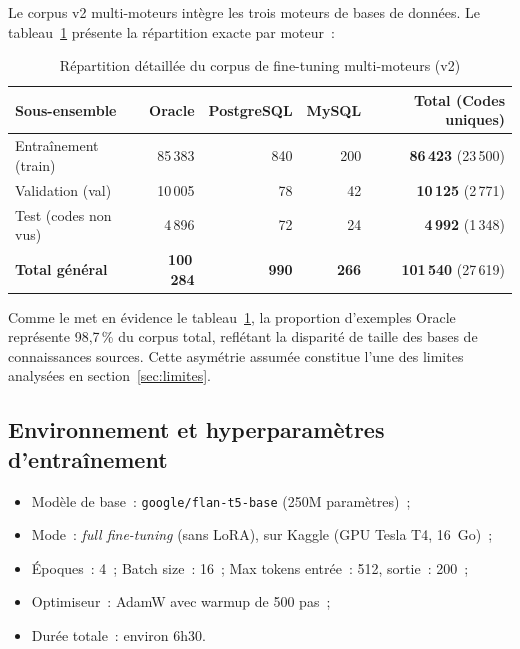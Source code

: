 \documentclass[12pt,a4paper]{report}
\begin{document}
Le corpus v2 multi-moteurs int\`egre les trois moteurs de bases de donn\'ees. Le
tableau~\ref{tab:splits} pr\'esente la r\'epartition exacte par moteur~:

\begin{table}[H]
  \centering
  \caption{R\'epartition d\'etaill\'ee du corpus de fine-tuning multi-moteurs (v2)}
  \label{tab:splits}
  \begin{tabularx}{\textwidth}{lrrrr}
    \toprule
    \textbf{Sous-ensemble} & \textbf{Oracle} & \textbf{PostgreSQL} & \textbf{MySQL} & \textbf{Total (Codes uniques)} \\
    \midrule
    Entra\^inement (train)      & 85\,383 & 840 & 200 & \textbf{86\,423} (23\,500) \\
    Validation (val)            & 10\,005 &  78 &  42 & \textbf{10\,125} (\phantom{0}2\,771) \\
    Test (codes non vus)        &  4\,896 &  72 &  24 &  \textbf{4\,992} (\phantom{0}1\,348) \\
    \midrule
    \textbf{Total g\'en\'eral}  & \textbf{100\,284} & \textbf{990} & \textbf{266} & \textbf{101\,540} (27\,619) \\
    \bottomrule
  \end{tabularx}
\end{table}

Comme le met en \'evidence le tableau~\ref{tab:splits}, la proportion d'exemples Oracle
repr\'esente 98,7\,\% du corpus total, refl\'etant la disparit\'e de taille des bases de
connaissances sources. Cette asym\'etrie assum\'ee constitue l'une des limites analys\'ees
en section~\ref{sec:limites}.

\subsection{Environnement et hyperparam\`etres d'entra\^inement}

\begin{itemize}[leftmargin=*]
  \item Mod\`ele de base~: \texttt{google/flan-t5-base} (250M param\`etres)~;
  \item Mode~: \emph{full fine-tuning} (sans LoRA), sur Kaggle (GPU Tesla T4, 16~Go)~;
  \item \'Epoques~: 4~; Batch size~: 16~; Max tokens entr\'ee~: 512, sortie~: 200~;
  \item Optimiseur~: AdamW avec warmup de 500 pas~;
  \item Dur\'ee totale~: environ 6h30.
\end{itemize}
\end{document}
